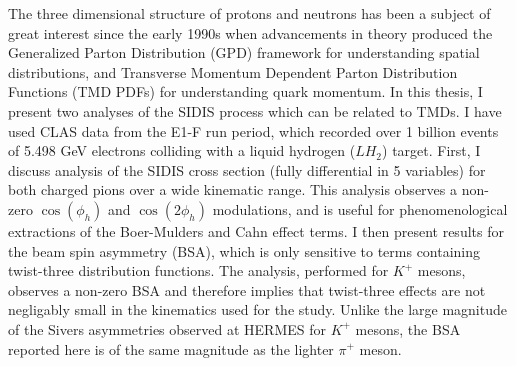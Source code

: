 The three dimensional structure of protons and neutrons has been a subject of great interest since the early 1990s when advancements in theory produced the Generalized Parton Distribution (GPD) framework for understanding spatial distributions, and Transverse Momentum Dependent Parton Distribution Functions (TMD PDFs) for understanding quark momentum.  In this thesis, I present two analyses of the SIDIS process which can be related to TMDs.  I have used CLAS data from the E1-F run period, which recorded over 1 billion events of 5.498 GeV electrons colliding with a liquid hydrogen ($LH_2$) target.  First, I discuss analysis of the SIDIS cross section (fully differential in 5 variables) for both charged pions over a wide kinematic range.  This analysis observes a non-zero $\cos(\phi_h)$ and $\cos(2\phi_h)$ modulations, and is useful for phenomenological extractions of the Boer-Mulders and Cahn effect terms.  I then present results for the beam spin asymmetry (BSA), which is only sensitive to terms containing twist-three distribution functions.  The analysis, performed for $K^+$ mesons, observes a non-zero BSA and therefore implies that twist-three effects are not negligably small in the kinematics used for the study.  Unlike the large magnitude of the Sivers asymmetries observed at HERMES for $K^+$ mesons, the BSA reported here is of the same magnitude as the lighter $\pi^+$ meson. 
